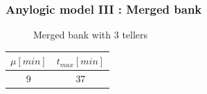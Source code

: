 \documentclass[10pt]{beamer}
\begin{document}
\begin{frame}
  \frametitle{Anylogic model III : Merged bank}
\begin{figure}
\centering
{}
\caption{Merged bank with 3 tellers}
\end{figure}

\begin{table}
\centering
\begin{tabular}{|c|c|}
\hline
$\mu[min]$ & $t_{max}[min]$ \\
\hline
9 & 37 \\
\hline
\end{tabular} 
\end{table}

\end{frame}
\end{document}
